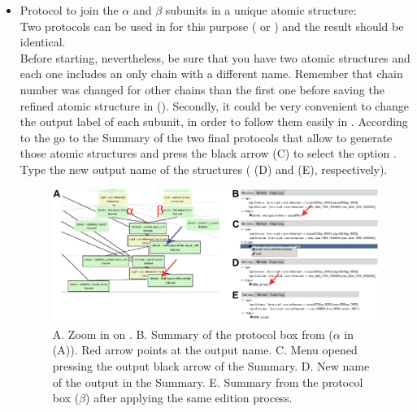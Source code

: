 \begin{itemize}
 \item Protocol to join the  $\alpha$ and $\beta$ subunits in a unique atomic structure:\\ Two protocols can be used in \scipion for this purpose ( or ) and the result should be identical. \\
 Before starting, nevertheless, be sure that you have two atomic structures and each one includes an only chain with a different name. Remember that chain number was changed for other chains than the first one before saving the refined atomic structure in \coot (). Secondly, it could be very convenient to change the \scipion output label of each subunit, in order to follow them easily in \scipion. According to the  go to the Summary of the two final protocols that allow to generate those atomic structures and press the black arrow (C) to select the option . Type the new output name of the structures ( (D) and  (E), respectively).\\
    
  \begin{figure}[H]
  \centering 
  \captionsetup{width=.9\linewidth} 
  \includegraphics[width=1\textwidth]{Images/Fig75}
  \caption{A. Zoom in on . B. Summary of the protocol box from \phenix {} ($\alpha$ in (A)). Red arrow points at the \scipion output name. C. Menu opened pressing the output black arrow of the Summary. D. New name of the \scipion output in the Summary. E. Summary from the protocol box \phenix {} ($\beta$) after applying the same edition process.}
  \label{fig:scipion_workflow_edition}
  \end{figure}
  

\end{itemize}
